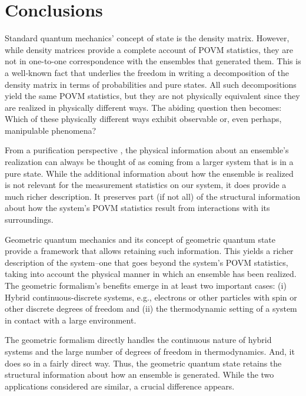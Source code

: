 \documentclass[draft,nofootinbib,pre,twocolumn,showpacs,showkeys,preprintnumbers,floatfix]{revtex4-1}
\newcommand{\1}{\mathbbm{1}}
\begin{document}
\section{Conclusions}
\label{sec:FINAL}

Standard quantum mechanics' concept of state is the density matrix. However,
while density matrices provide a complete account of POVM statistics, they are
not in one-to-one correspondence with the ensembles that generated them. This
is a well-known fact that underlies the freedom in writing a decomposition of
the density matrix in terms of probabilities and pure states.  All such
decompositions yield the same POVM statistics, but they are not physically
equivalent since they are realized in physically different ways. The abiding
question then becomes: Which of these physically different ways exhibit
observable or, even perhaps, manipulable phenomena?

From a purification perspective \cite{Wilde2017}, the physical information
about an ensemble's realization can always be thought of as coming from a
larger system that is in a pure state. While the additional information about
how the ensemble is realized is not relevant for the measurement statistics on
our system, it does provide a much richer description. It preserves part (if
not all) of the structural information about how the system's POVM statistics
result from interactions with its surroundings.
 
Geometric quantum mechanics and its concept of geometric quantum state provide
a framework that allows retaining such information. This yields a richer
description of the system--one that goes beyond the system's POVM statistics, 
taking into account the physical manner in which an ensemble has been realized.
The geometric formalism's benefits emerge in at least two important cases:
(i) Hybrid continuous-discrete systems, e.g., electrons or other particles with
spin or other discrete degrees of freedom and (ii) the thermodynamic setting
of a system in contact with a large environment.

The geometric formalism directly handles the continuous nature of hybrid
systems and the large number of degrees of freedom in thermodynamics. And, it
does so in a fairly direct way. Thus, the geometric quantum state retains the 
structural information about how an ensemble is generated. While the 
two applications considered are similar, a crucial difference appears.
\end{document}
